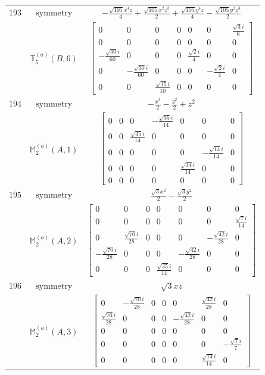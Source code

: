 \documentclass[fleqn,8pt,landscape]{jsarticle}
\begin{document}
\begin{longtable}{ccc}
$ 193 $ & $ \text{symmetry} $ & $ - \frac{\sqrt{105} x^{4} z}{4} + \frac{\sqrt{105} x^{2} z^{3}}{2} + \frac{\sqrt{105} y^{4} z}{4} - \frac{\sqrt{105} y^{2} z^{3}}{2} $ \\
$  $ & $ \mathbb{T}_{5}^{(a)}(B,6) $ & $ \begin{bmatrix} 0 & 0 & 0 & 0 & 0 & 0 & \frac{\sqrt{3} i}{6} \\ 0 & 0 & 0 & 0 & 0 & 0 & 0 \\ - \frac{\sqrt{30} i}{60} & 0 & 0 & 0 & \frac{\sqrt{2} i}{4} & 0 & 0 \\ 0 & - \frac{\sqrt{30} i}{60} & 0 & 0 & 0 & - \frac{\sqrt{2} i}{4} & 0 \\ 0 & 0 & \frac{\sqrt{15} i}{10} & 0 & 0 & 0 & 0 \end{bmatrix} $ \\ \hline
$ 194 $ & $ \text{symmetry} $ & $ - \frac{x^{2}}{2} - \frac{y^{2}}{2} + z^{2} $ \\
$  $ & $ \mathbb{M}_{2}^{(a)}(A,1) $ & $ \begin{bmatrix} 0 & 0 & 0 & - \frac{\sqrt{35} i}{14} & 0 & 0 & 0 \\ 0 & 0 & \frac{\sqrt{35} i}{14} & 0 & 0 & 0 & 0 \\ 0 & 0 & 0 & 0 & 0 & - \frac{\sqrt{14} i}{14} & 0 \\ 0 & 0 & 0 & 0 & \frac{\sqrt{14} i}{14} & 0 & 0 \\ 0 & 0 & 0 & 0 & 0 & 0 & 0 \end{bmatrix} $ \\ \hline
$ 195 $ & $ \text{symmetry} $ & $ \frac{\sqrt{3} x^{2}}{2} - \frac{\sqrt{3} y^{2}}{2} $ \\
$  $ & $ \mathbb{M}_{2}^{(a)}(A,2) $ & $ \begin{bmatrix} 0 & 0 & 0 & 0 & 0 & 0 & 0 \\ 0 & 0 & 0 & 0 & 0 & 0 & \frac{\sqrt{7} i}{14} \\ 0 & \frac{\sqrt{70} i}{28} & 0 & 0 & 0 & - \frac{\sqrt{42} i}{28} & 0 \\ - \frac{\sqrt{70} i}{28} & 0 & 0 & 0 & - \frac{\sqrt{42} i}{28} & 0 & 0 \\ 0 & 0 & 0 & \frac{\sqrt{35} i}{14} & 0 & 0 & 0 \end{bmatrix} $ \\ \hline
$ 196 $ & $ \text{symmetry} $ & $ \sqrt{3} x z $ \\
$  $ & $ \mathbb{M}_{2}^{(a)}(A,3) $ & $ \begin{bmatrix} 0 & - \frac{\sqrt{70} i}{28} & 0 & 0 & 0 & \frac{\sqrt{42} i}{28} & 0 \\ \frac{\sqrt{70} i}{28} & 0 & 0 & 0 & - \frac{\sqrt{42} i}{28} & 0 & 0 \\ 0 & 0 & 0 & 0 & 0 & 0 & 0 \\ 0 & 0 & 0 & 0 & 0 & 0 & - \frac{\sqrt{7} i}{7} \\ 0 & 0 & 0 & 0 & 0 & \frac{\sqrt{14} i}{14} & 0 \end{bmatrix} $ \\ \hline

\end{longtable}
\end{document}
